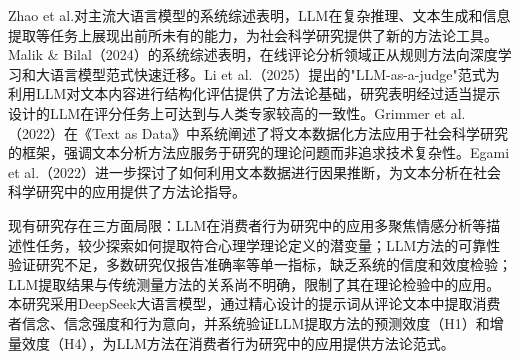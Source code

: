 Zhao et al.\cite{zhao2023}对主流大语言模型的系统综述表明，LLM在复杂推理、文本生成和信息提取等任务上展现出前所未有的能力，为社会科学研究提供了新的方法论工具。Malik \& Bilal（2024）\cite{malik2024}的系统综述表明，在线评论分析领域正从规则方法向深度学习和大语言模型范式快速迁移。Li et al.（2025）\cite{li2025llm}提出的"LLM-as-a-judge"范式为利用LLM对文本内容进行结构化评估提供了方法论基础，研究表明经过适当提示设计的LLM在评分任务上可达到与人类专家较高的一致性。Grimmer et al.（2022）\cite{grimmer2022}在《Text as Data》中系统阐述了将文本数据化方法应用于社会科学研究的框架，强调文本分析方法应服务于研究的理论问题而非追求技术复杂性。Egami et al.（2022）\cite{egami2022}进一步探讨了如何利用文本数据进行因果推断，为文本分析在社会科学研究中的应用提供了方法论指导。

现有研究存在三方面局限：LLM在消费者行为研究中的应用多聚焦情感分析等描述性任务，较少探索如何提取符合心理学理论定义的潜变量；LLM方法的可靠性验证研究不足，多数研究仅报告准确率等单一指标，缺乏系统的信度和效度检验；LLM提取结果与传统测量方法的关系尚不明确，限制了其在理论检验中的应用。本研究采用DeepSeek大语言模型，通过精心设计的提示词从评论文本中提取消费者信念、信念强度和行为意向，并系统验证LLM提取方法的预测效度（H1）和增量效度（H4），为LLM方法在消费者行为研究中的应用提供方法论范式。
